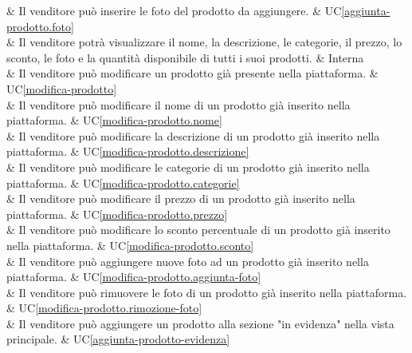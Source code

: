  & Il venditore può inserire le foto del prodotto da aggiungere. & UC\ref{aggiunta-prodotto.foto} \\
	
 & Il venditore potrà visualizzare il nome, la descrizione, le categorie, il prezzo, lo sconto, le foto e la quantità disponibile di tutti i suoi prodotti. & Interna \\
    
 & Il venditore può modificare un prodotto già presente nella piattaforma. & UC\ref{modifica-prodotto} \\
    
 & Il venditore può modificare il nome di un prodotto già inserito nella piattaforma. & UC\ref{modifica-prodotto.nome} \\
    
 & Il venditore può modificare la descrizione di un prodotto già inserito nella piattaforma. & UC\ref{modifica-prodotto.descrizione} \\
    
 & Il venditore può modificare le categorie di un prodotto già inserito nella piattaforma. & UC\ref{modifica-prodotto.categorie} \\
    
 & Il venditore può modificare il prezzo di un prodotto già inserito nella piattaforma. & UC\ref{modifica-prodotto.prezzo} \\
    
 & Il venditore può modificare lo sconto percentuale di un prodotto già inserito nella piattaforma. & UC\ref{modifica-prodotto.sconto} \\
    
 & Il venditore può aggiungere nuove foto ad un prodotto già inserito nella piattaforma. & UC\ref{modifica-prodotto.aggiunta-foto} \\
    
 & Il venditore può rimuovere le foto di un prodotto già inserito nella piattaforma. & UC\ref{modifica-prodotto.rimozione-foto} \\
    
 & Il venditore può aggiungere un prodotto alla sezione "in evidenza" nella vista principale. & UC\ref{aggiunta-prodotto-evidenza} \\

